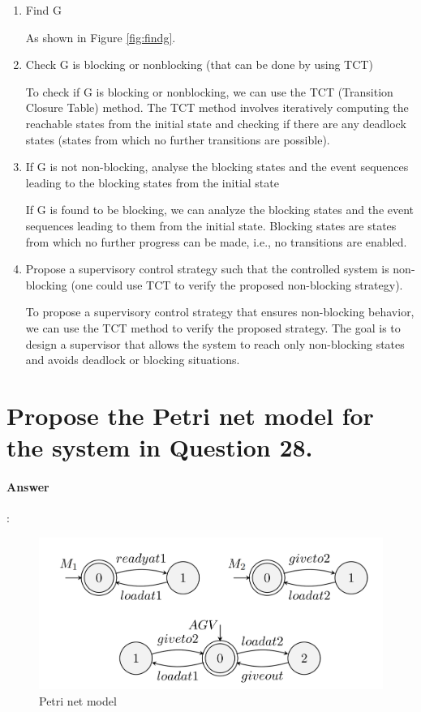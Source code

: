 \documentclass{article}
\begin{document}
\begin{enumerate}
  \item Find G 
  
  As shown in Figure \ref{fig:findg}.
  \item Check G is blocking or nonblocking (that can be done by using TCT)
  
  To check if G is blocking or nonblocking, we can use the TCT (Transition Closure Table) method. The TCT method involves iteratively computing the reachable states from the initial state and checking if there are any deadlock states (states from which no further transitions are possible).
  \item If G is not non-blocking, analyse the blocking states and the event sequences leading to the blocking states from the initial state
  
  If G is found to be blocking, we can analyze the blocking states and the event sequences leading to them from the initial state. Blocking states are states from which no further progress can be made, i.e., no transitions are enabled.
  \item Propose a supervisory control strategy such that the controlled system is non-blocking (one could use TCT to verify the proposed non-blocking strategy).
  
  To propose a supervisory control strategy that ensures non-blocking behavior, we can use the TCT method to verify the proposed strategy. The goal is to design a supervisor that allows the system to reach only non-blocking states and avoids deadlock or blocking situations.
\end{enumerate}

\section{Propose the Petri net model for the system in Question 28.}

\paragraph{Answer}:


\begin{figure}
  \centering
  \includegraphics[width=0.5\linewidth]{assets/DES29.png}
  \caption{Petri net model}
  \label{fig:des29}
\end{figure}
\end{document}
